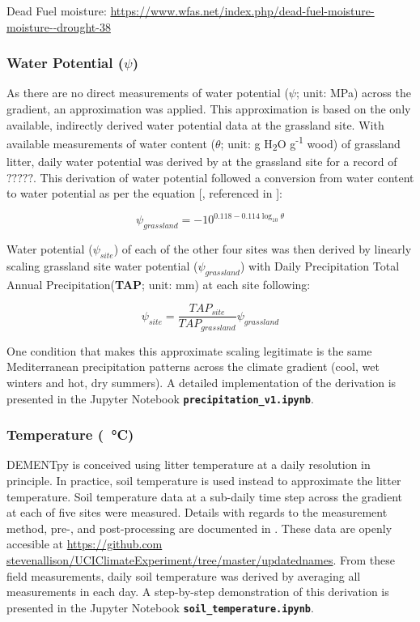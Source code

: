 \documentclass[letterpaper, 10pt]{article}
\begin{document}
Dead Fuel moisture: \url{https://www.wfas.net/index.php/dead-fuel-moisture-moisture--drought-38}

\subsubsection{Water Potential ($\psi$)}
As there are no direct measurements of water potential ($\psi$; unit: MPa) across the gradient, an approximation was applied. This approximation is based on the only available, indirectly derived water potential data at the grassland site. With available measurements of water content ($\theta$; unit: g H\textsubscript{2}O g\textsuperscript{-1} wood) of grassland litter, daily water potential was derived by \citet{allison2017consequences} at the grassland site for a record of $?????$. This derivation of water potential followed a conversion from water content to water potential as per the equation [\citet{dix1985changes}, referenced in \citet{allison2017consequences}]:

\begin{equation}
  \psi_{grassland} = -10^{0.118-0.114\log_{10} \theta}
\end{equation}

Water potential ($\psi_{site}$) of each of the other four sites was then derived by linearly scaling grassland site water potential ($\psi_{grassland}$) with Daily Precipitation Total Annual Precipitation(\textbf{TAP}; unit: mm) at each site following:

\begin{equation}
  \psi_{site} = \frac{TAP_{site}}{TAP_{grassland}} \psi_{grassland}
\end{equation}

One condition that makes this approximate scaling legitimate is the same Mediterranean precipitation patterns across the climate gradient (cool, wet winters and hot, dry summers). A detailed implementation of the derivation is presented in the Jupyter Notebook \textbf{\texttt{precipitation\_v1.ipynb}}.


\subsubsection{Temperature (\SI{}{\celsius})}
DEMENTpy is conceived using litter temperature at a daily resolution in principle. In practice, soil temperature is
used instead to approximate the litter temperature. Soil temperature data at a sub-daily time step across the gradient
at each of five sites were measured. Details with regards to the measurement method, pre-, and post-processing are
documented in \citet{glassman2018decomposition}. These data are openly accesible at \url{https://github.com
stevenallison/UCIClimateExperiment/tree/master/updatednames}. From these field measurements, daily soil
temperature was derived by averaging all measurements in each day. A step-by-step demonstration of this derivation
is presented in the Jupyter Notebook \textbf{\texttt{soil\_temperature.ipynb}}.
\end{document}
